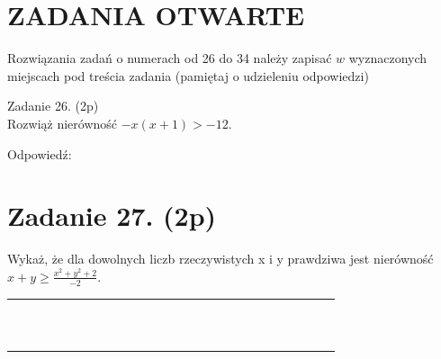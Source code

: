 \documentclass[10pt]{article}
\begin{document}
\section*{ZADANIA OTWARTE}
Rozwiązania zadań o numerach od 26 do 34 należy zapisać \(w\) wyznaczonych miejscach pod treścia zadania (pamiętaj o udzieleniu odpowiedzi)

Zadanie 26. (2p)\\
Rozwiąż nierówność \(-x(x+1)>-12\).

Odpowiedź:

\section*{Zadanie 27. (2p)}
Wykaż, że dla dowolnych liczb rzeczywistych x i y prawdziwa jest nierówność \(x+y \geq \frac{x^{2}+y^{2}+2}{-2}\).

\begin{center}
\begin{tabular}{|c|c|c|c|c|c|c|c|c|c|c|c|c|c|c|c|c|c|c|c|c|c|c|c|c|c|}
\hline
 &  &  &  &  &  &  &  &  &  &  &  &  &  &  &  &  &  &  &  &  &  &  &  &  &  \\
\hline
 &  &  &  &  &  &  &  &  &  &  &  &  &  &  &  &  &  &  &  &  &  &  &  &  &  \\
\hline
 &  &  &  &  &  &  &  &  &  &  &  &  &  &  &  &  &  &  &  &  &  &  &  &  &  \\
\hline
 &  &  &  &  &  &  &  &  &  &  &  &  &  &  &  &  &  &  &  &  &  &  &  &  &  \\
\hline
 &  &  &  &  &  &  &  &  &  &  &  &  &  &  &  &  &  &  &  &  &  &  &  &  &  \\
\hline
 &  &  &  &  &  &  &  &  &  &  &  &  &  &  &  &  &  &  &  &  &  &  &  &  &  \\
\hline
 &  &  &  &  &  &  &  &  &  &  &  &  &  &  &  &  &  &  &  &  &  &  &  &  &  \\
\hline
 &  &  &  &  &  &  &  &  &  &  &  &  &  &  &  &  &  &  &  &  &  &  &  &  &  \\
\hline
 &  &  &  &  &  &  &  &  &  &  &  &  &  &  &  &  &  &  &  &  &  &  &  &  &  \\
\hline
 &  &  &  &  &  &  &  &  &  &  &  &  &  &  &  &  &  &  &  &  &  &  &  &  &  \\
\hline
 &  &  &  &  &  &  &  &  &  &  &  &  &  &  &  &  &  &  &  &  &  &  &  &  &  \\
\hline
 &  &  &  &  &  &  &  &  &  &  &  &  &  &  &  &  &  &  &  &  &  &  &  &  &  \\
\hline
\end{tabular}
\end{center}
\end{document}
